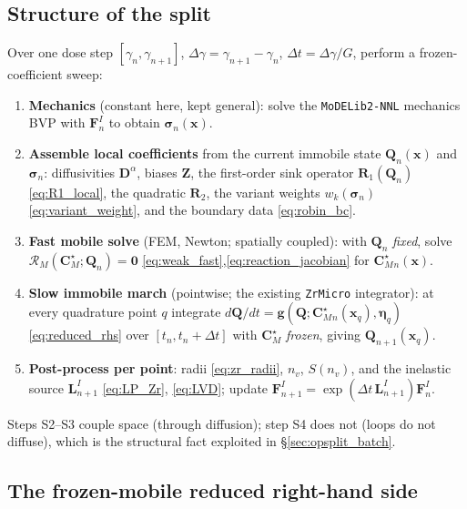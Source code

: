 \documentclass[11pt]{article}
\newcommand{\CM}{\mathbf{C}_{M}}
\newcommand{\Rone}{\mathbf{R}_{1}}
\newcommand{\Rtwo}{\mathbf{R}_{2}}
\newcommand{\sig}{\bm{\sigma}}
\newcommand{\dt}{\Delta t}
\newcommand{\dg}{\Delta \gamma}
\newcommand{\ZrMicro}{\texttt{ZrMicro}}
\newcommand{\MoDELib}{\texttt{MoDELib2-NNL}}
\begin{document}
\subsection{Structure of the split}
\label{sec:opsplit_structure}

Over one dose step $[\gamma_n,\gamma_{n+1}]$, $\dg=\gamma_{n+1}-\gamma_n$,
$\dt=\dg/G$, perform a frozen-coefficient sweep:
\begin{enumerate}[label=\textbf{S\arabic*.},leftmargin=2.2em,itemsep=2pt]
\item \textbf{Mechanics} (constant here, kept general): solve the \MoDELib{}
mechanics BVP with $\mathbf F^I_n$ to obtain $\sig_n(\mathbf x)$.
\item \textbf{Assemble local coefficients} from the current immobile state
$\mathbf Q_n(\mathbf x)$ and $\sig_n$: diffusivities $\mathbf D^\alpha$, biases
$\mathbf Z$, the first-order sink operator $\Rone(\mathbf Q_n)$
\eqref{eq:R1_local}, the quadratic $\Rtwo$, the variant weights $w_k(\sig_n)$
\eqref{eq:variant_weight}, and the boundary data \eqref{eq:robin_bc}.
\item \textbf{Fast mobile solve} (FEM, Newton; spatially coupled): with
$\mathbf Q_n$ \emph{fixed}, solve $\mathcal R_M(\CM^\star;\mathbf Q_n)=\mathbf 0$
\eqref{eq:weak_fast},\eqref{eq:reaction_jacobian} for $\CM^\star_n(\mathbf x)$.
\item \textbf{Slow immobile march} (pointwise; the existing \ZrMicro{} integrator):
at every quadrature point $q$ integrate $d\mathbf Q/dt=\mathbf g(\mathbf Q;\CM^\star_n(\mathbf x_q),\bm\eta_q)$
\eqref{eq:reduced_rhs} over $[t_n,t_n+\dt]$ with $\CM^\star$ \emph{frozen},
giving $\mathbf Q_{n+1}(\mathbf x_q)$.
\item \textbf{Post-process per point}: radii \eqref{eq:zr_radii}, $n_v$,
$S(n_v)$, and the inelastic source $\mathbf L^I_{n+1}$ \eqref{eq:LP_Zr},
\eqref{eq:LVD}; update $\mathbf F^I_{n+1}=\exp(\dt\,\mathbf L^I_{n+1})\mathbf F^I_n$.
\end{enumerate}
Steps S2--S3 couple space (through diffusion); step S4 does not (loops do not
diffuse), which is the structural fact exploited in \S\ref{sec:opsplit_batch}.

\subsection{The frozen-mobile reduced right-hand side}
\label{sec:opsplit_rhs}
\end{document}

